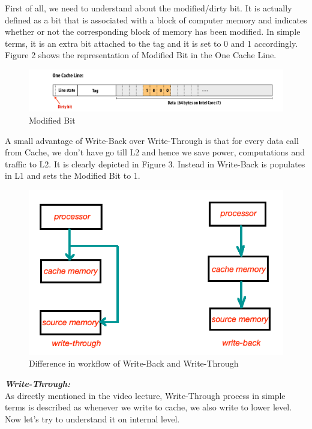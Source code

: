 \documentclass[12pt]{article}
\begin{document}
First of all, we need to understand about the modified/dirty bit. It is actually defined as a bit that is associated with a block of computer memory and indicates whether or not the corresponding block of memory has been modified. In simple terms, it is an extra bit attached to the tag and it is set to 0 and 1 accordingly.
Figure 2 shows the representation of Modified Bit in the One Cache Line.

\begin{figure}
    \centering
    \includegraphics{Assignment-10/modified_bit.png}
    \caption{Modified Bit}
\end{figure}

A small advantage of Write-Back over Write-Through is that for every data call from Cache, we don't have go till L2 and hence we save power, computations and traffic to L2. It is clearly depicted in Figure 3. Instead in Write-Back is populates in L1 and sets the Modified Bit to 1. \\

\begin{figure}
    \centering
    \includegraphics[scale=0.5]{Assignment-10/data-cache.png}
    \caption{Difference in workflow of Write-Back and Write-Through}
\end{figure}

\textbf{\textit{Write-Through:}} \\
As directly mentioned in the video lecture, Write-Through process in simple terms is described as whenever we write to cache, we also write to lower level. Now let's try to understand it on internal level.
\end{document}
